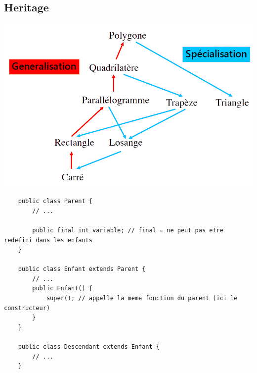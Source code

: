 \documentclass[a4paper, 12pt, french]{article}
\begin{document}
	\subsection{Heritage}

	\includegraphics[width=13.8cm]{java_00_heritage}

	\begin{lstlisting}
	public class Parent {
		// ...

		public final int variable; // final = ne peut pas etre redefini dans les enfants
	}

	public class Enfant extends Parent {
		// ...
		public Enfant() {
			super(); // appelle la meme fonction du parent (ici le constructeur)
		}
	}

	public class Descendant extends Enfant {
		// ...
	}
	\end{lstlisting}
\end{document}
